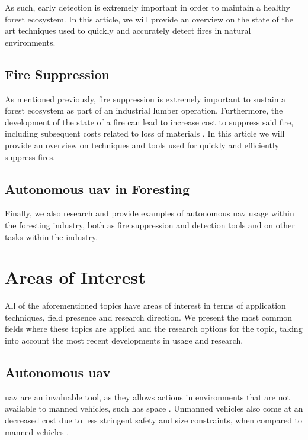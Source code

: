 \documentclass[runningheads]{llncs}
\begin{document}
As such, early detection is extremely important in order to maintain a healthy forest ecosystem. In this article, we will provide an overview on the state of the art techniques used to quickly and accurately detect fires in natural environments.

\subsection{Fire Suppression}

As mentioned previously, fire suppression is extremely important to sustain a forest ecosystem as part of an industrial lumber operation. Furthermore, the development of the state of a fire can lead to increase cost to suppress said fire, including subsequent costs related to loss of materials . In this article we will provide an overview on techniques and tools used for quickly and efficiently suppress fires.

\subsection{Autonomous \acrshort{uav} in Foresting}

Finally, we also research and provide examples of autonomous \acrshort{uav} usage within the foresting industry, both as fire suppression and detection tools and on other tasks within the industry.

\section{Areas of Interest}

All of the aforementioned topics have areas of interest in terms of application techniques, field presence and research direction. We present the most common fields where these topics are applied and the research options for the topic, taking into account the most recent developments in usage and research.

\subsection{Autonomous \acrshort{uav}}

\acrshort{uav} are an invaluable tool, as they allows actions in environments that are not available to manned vehicles, such has space . Unmanned vehicles also come at an decreased cost due to less stringent safety and size constraints, when compared to manned vehicles .
\end{document}
